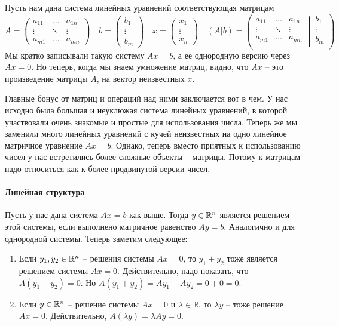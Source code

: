 Пусть нам дана система линейных уравнений соответствующая матрицам
\[
A= 
\begin{pmatrix}
a_{11}&\ldots& a_{1n}\\
\vdots&\ddots&\vdots\\
a_{m1}& \ldots &a_{mn}
\end{pmatrix}\quad
b = 
\begin{pmatrix}
b_1\\
\vdots\\
b_m
\end{pmatrix} \quad
x =
\begin{pmatrix}
x_1\\
\vdots\\
x_n
\end{pmatrix}\quad
(A|b) =
\left(\left.
\begin{matrix}
a_{11}&\ldots&a_{1n}\\
\vdots&\ddots&\vdots\\
a_{m1}&\ldots&a_{mn}\\
\end{matrix}
\:\right|\:
\begin{matrix}
b_1\\
\vdots\\
b_m\\
\end{matrix}\right)
\]
Мы кратко записывали такую систему $Ax = b$, а ее однородную версию через $Ax = 0$. Но теперь, когда мы знаем умножение матриц, видно, что $Ax$ -- это произведение матрицы $A$, на вектор неизвестных $x$.

Главные бонус от матриц и операций над ними заключается вот в чем. У нас исходно была большая и неуклюжая система линейных уравнений, в которой участвовали очень знакомые и простые для использования числа. Теперь же мы заменили много линейных уравнений с кучей неизвестных на одно линейное матричное уравнение $Ax = b$. Однако, теперь вместо приятных к использованию чисел у нас встретились более сложные объекты -- матрицы. Потому к матрицам надо относиться как к более продвинутой версии чисел.

\paragraph{Линейная структура}
Пусть у нас дана система $Ax = b$ как выше. Тогда $y\in\mathbb R^{n}$ является решением этой системы, если выполнено матричное равенство $Ay = b$. Аналогично и для однородной системы. Теперь заметим следующее:
\begin{enumerate}
\item Если $y_1, y_2\in \mathbb R^{n}$ -- решения системы $Ax = 0$, то $y_1 + y_2$ тоже является решением системы $Ax = 0$. Действительно, надо показать, что $A(y_1 + y_2) = 0$. Но $A(y_1 + y_2) = A y_1 + Ay_2 = 0 + 0 = 0$.
\item Если $y\in\mathbb R^{n}$ -- решение системы $Ax = 0$ и $\lambda\in \mathbb R$, то $\lambda y$ -- тоже решение $Ax = 0$. Действительно, $A(\lambda y) = \lambda Ay = 0$. 
\end{enumerate}


